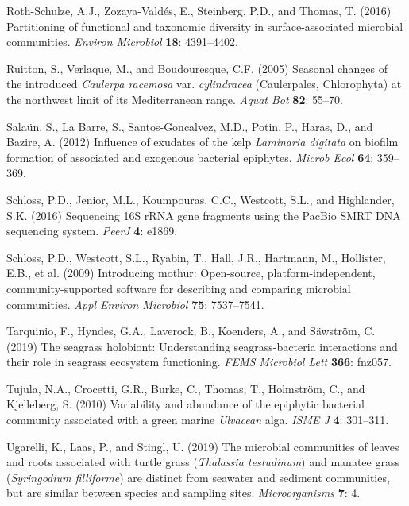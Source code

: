 \documentclass[12pt,]{article}
\begin{document}
\leavevmode\hypertarget{ref-Roth-Schulze2016}{}%
Roth-Schulze, A.J., Zozaya-Valdés, E., Steinberg, P.D., and Thomas, T.
(2016) Partitioning of functional and taxonomic diversity in
surface-associated microbial communities. \emph{Environ Microbiol}
\textbf{18}: 4391--4402.

\leavevmode\hypertarget{ref-Ruitton2005}{}%
Ruitton, S., Verlaque, M., and Boudouresque, C.F. (2005) Seasonal
changes of the introduced \emph{Caulerpa racemosa} var.
\emph{cylindracea} (Caulerpales, Chlorophyta) at the northwest limit of
its Mediterranean range. \emph{Aquat Bot} \textbf{82}: 55--70.

\leavevmode\hypertarget{ref-Salaun2012}{}%
Salaün, S., La Barre, S., Santos-Goncalvez, M.D., Potin, P., Haras, D.,
and Bazire, A. (2012) Influence of exudates of the kelp \emph{Laminaria
digitata} on biofilm formation of associated and exogenous bacterial
epiphytes. \emph{Microb Ecol} \textbf{64}: 359--369.

\leavevmode\hypertarget{ref-Schloss2016}{}%
Schloss, P.D., Jenior, M.L., Koumpouras, C.C., Westcott, S.L., and
Highlander, S.K. (2016) Sequencing 16S rRNA gene fragments using the
PacBio SMRT DNA sequencing system. \emph{PeerJ} \textbf{4}: e1869.

\leavevmode\hypertarget{ref-Schloss2009}{}%
Schloss, P.D., Westcott, S.L., Ryabin, T., Hall, J.R., Hartmann, M.,
Hollister, E.B., et al. (2009) Introducing mothur: Open-source,
platform-independent, community-supported software for describing and
comparing microbial communities. \emph{Appl Environ Microbiol}
\textbf{75}: 7537--7541.

\leavevmode\hypertarget{ref-Tarquinio2019}{}%
Tarquinio, F., Hyndes, G.A., Laverock, B., Koenders, A., and Säwström,
C. (2019) The seagrass holobiont: Understanding seagrass-bacteria
interactions and their role in seagrass ecosystem functioning.
\emph{FEMS Microbiol Lett} \textbf{366}: fnz057.

\leavevmode\hypertarget{ref-Tujula2010}{}%
Tujula, N.A., Crocetti, G.R., Burke, C., Thomas, T., Holmström, C., and
Kjelleberg, S. (2010) Variability and abundance of the epiphytic
bacterial community associated with a green marine \emph{Ulvacean} alga.
\emph{ISME J} \textbf{4}: 301--311.

\leavevmode\hypertarget{ref-Ugarelli2019}{}%
Ugarelli, K., Laas, P., and Stingl, U. (2019) The microbial communities
of leaves and roots associated with turtle grass (\emph{Thalassia
testudinum}) and manatee grass (\emph{Syringodium filliforme}) are
distinct from seawater and sediment communities, but are similar between
species and sampling sites. \emph{Microorganisms} \textbf{7}: 4.
\end{document}

